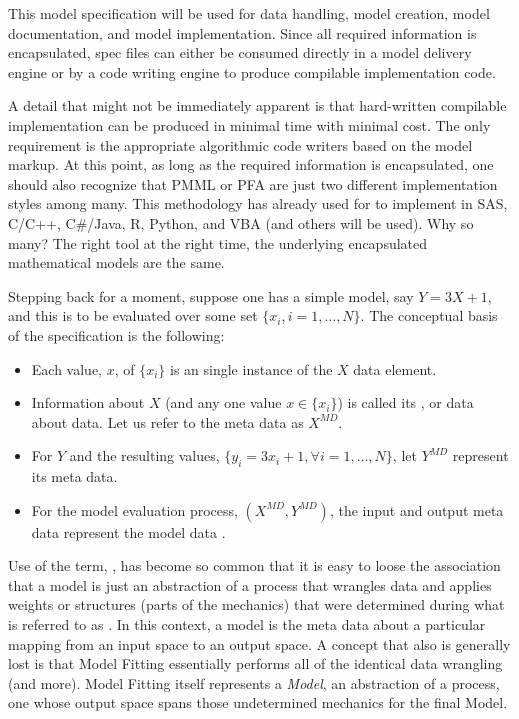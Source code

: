 \documentclass[10pt]{article}
\begin{document}
This model specification will be used for data handling, model creation, model documentation, and model implementation.  Since all required
information is encapsulated, spec files can either be consumed directly in a model delivery engine or by a code writing engine 
to produce compilable implementation code.

A detail that might not be immediately apparent is that hard-written compilable implementation can be produced in minimal time with minimal cost.
The only requirement is the appropriate algorithmic code writers based on
the model markup.  At this point, as long as the required information is encapsulated, one should also recognize that PMML or PFA are just
two different implementation styles among many.
This methodology has already 
used for to implement in SAS, C/C++, C\#/Java, R, Python, and VBA (and 
others will be used).  Why so many?  The right tool at the right time, the underlying encapsulated mathematical models are the same.

Stepping back for a moment, suppose one has a simple model, say $Y = 3X +1$, and this is to be evaluated over some set $\{x_i, i=1,\ldots,N\}$.  
The conceptual basis of the specification is the following:
    \begin{itemize}[label=-,noitemsep,topsep=0pt]
        \item Each value, $x$, of $\{x_i\}$ is an single instance of the $X$ data element.
        \item Information about $X$ (and any one value $x\in \{x_i\}$) is called its , or data about data. Let us refer to 
            the meta data as $X^{MD}$.
        \item For $Y$ and the resulting values, $\{y_i=3x_i+1, \forall i=1,\ldots,N\}$, let $Y^{MD}$ represent its meta data.
        \item For the model evaluation process, $(X^{MD}, Y^{MD})$, the input and output meta data represent the model data .
    \end{itemize}
Use of the term, , has become so common that it is easy to loose the association that a model is just an abstraction of a
process that wrangles data and applies weights or structures (parts of the mechanics) 
that were determined during what is referred to as .
In this context, a model is the meta data about a particular mapping from an input space to an output space.
A concept that also is generally lost is that Model Fitting essentially performs all of the identical data wrangling (and more).  Model Fitting 
itself represents a {\em Model}, an abstraction of a process, one whose output space spans those undetermined mechanics for the final Model.  
\end{document}
